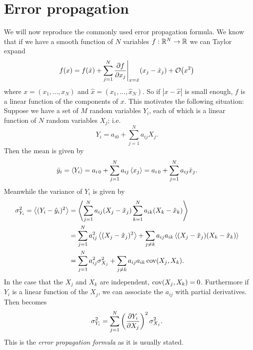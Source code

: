 \section{Error propagation}\label{sec:prop}
We will now reproduce the commonly used error propagation formula. We know
that if we have a smooth function of $N$ variables 
$f:\mathbb{R}^N\to\mathbb{R}$ we can Taylor expand
\begin{equation}
  f(x)=f(\hat{x})+\sum_{j=1}^N
        \pdv{f}{x_j}\Bigg|_{x=\hat{x}}(x_j-\hat{x}_j)
        +\order{x^2}
\end{equation}
where $x=(x_1,...,x_N)$ and $\hat{x}=(\hat{x}_1,...,\hat{x}_N)$. So if 
$|x-\hat{x}|$ is small enough, $f$ is a linear function of the components 
of $x$. This motivates the following situation: Suppose we have a set of 
$M$ random variables $Y_i$, each of which is a linear function of $N$ 
random variables $X_j$; i.e.
\begin{equation}\label{eq:lintran}
  Y_i=a_{i0}+\sum_{j=1}^N a_{ij}X_j.
\end{equation}
Then the mean is given by
\begin{equation}
  \hat{y}_i=\ev{Y_i}=a_{i\,0}+\sum_{j=1}^N a_{ij}\ev{x_j}
           =a_{i\,0}+\sum_{j=1}^N a_{ij}\hat{x}_j.
\end{equation}
Meanwhile the variance of $Y_i$ is given by
\begin{equation}\label{eq:linprop}
  \begin{aligned}
    \sigma^2_{Y_i}=\ev{(Y_i-\hat{y}_i)^2}
              &=\ev{\sum_{j=1}^N a_{ij}(X_j-\hat{x}_j)
                   \sum_{k=1}^N a_{ik}(X_k-\hat{x}_k)}\\
              &=\sum_{j=1}^N a_{ij}^2\ev{(X_j-\hat{x}_j)^2}
               +\sum_{j\neq k}a_{ij}a_{ik}
                \ev{(X_j-\hat{x}_j)(X_k-\hat{x}_k)}\\
              &=\sum_{j=1}^N a_{ij}^2\sigma^2_{X_j}
               +\sum_{j\neq k}a_{ij}a_{ik}\Cov(X_j,X_k).
  \end{aligned}
\end{equation}
In the case that the $X_j$ and $X_k$ are independent, $\operatorname{cov}(X_j,X_k)=0$.
Furthermore if $Y_i$ is a linear function of the $X_j$, we 
can associate the $a_{ij}$ with partial derivatives. Then 
 becomes
\begin{equation}\label{eq:errprop}\index{error propagation formula}
  \sigma^2_{Y_i}=
   \sum_{j=1}^N\left(\pdv{Y_i}{X_j}\right)^2\sigma_{X_j}^2.
\end{equation}
This is the {\it error propagation formula} as it is usually stated. 
